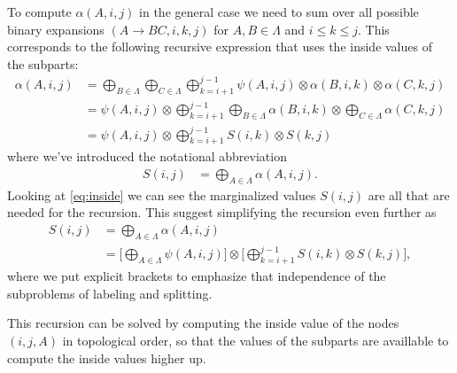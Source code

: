   To compute $\alpha(A, i, j)$ in the general case we need to sum over all possible binary expansions $(A \to B C, i, k, j)$ for $A, B \in \Lambda$ and $i \leq k \leq j$. This corresponds to the following recursive expression that uses the inside values of the subparts:
  \begin{align*}
    \label{eq:inside}
    \alpha(A, i, j)
      &= \bigoplus_{B \in \Lambda} \bigoplus_{C \in \Lambda} \bigoplus_{k=i+1}^{j-1} \psi(A, i, j) \otimes \alpha(B,i,k) \otimes \alpha(C,k,j) \\
      &= \psi(A, i, j) \otimes \bigoplus_{k=i+1}^{j-1} \bigoplus_{B \in \Lambda} \alpha(B,i,k) \otimes \bigoplus_{C \in \Lambda} \alpha(C,k,j) \\
      &= \psi(A, i, j) \otimes \bigoplus_{k=i+1}^{j-1} S(i,k) \otimes S(k,j)
  \end{align*}
  where we've introduced the notational abbreviation
  \begin{align*}
      S(i,j) &= \bigoplus_{A \in \Lambda} \alpha(A,i,j).
  \end{align*}
  Looking at \ref{eq:inside} we can see the marginalized values $S(i, j)$ are all that are needed for the recursion. This suggest simplifying the recursion even further as
  \begin{align*}
    \label{eq:inside-simplified}
    S(i, j)
      &= \bigoplus_{A \in \Lambda} \alpha(A,i,j) \\
      &= \Bigg[ \bigoplus_{A \in \Lambda} \psi(A, i, j) \Bigg] \otimes \Bigg[\bigoplus_{k=i+1}^{j-1} S(i,k) \otimes  S(k,j) \Bigg],
  \end{align*}
  where we put explicit brackets to emphasize that independence of the subproblems of labeling and splitting.

  This recursion can be solved by computing the inside value of the nodes $(i, j, A)$ in topological order, so that the values of the subparts are availlable to compute the inside values higher up.

